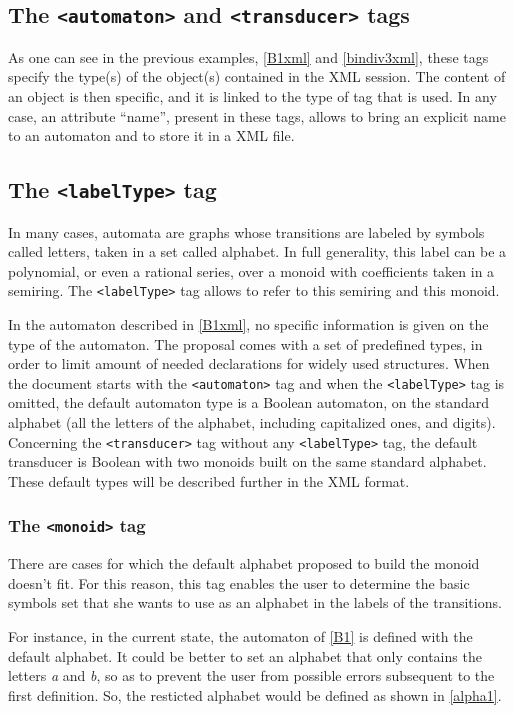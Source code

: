 \documentclass[a4paper]{article}
\newcommand{\xtag}[1]{\texttt{<#1>}}
\def\typetag{\xtag{labelType}}
\def\automatontag{\xtag{automaton}}
\def\transducertag{\xtag{transducer}}
\def\monoidtag{\xtag{monoid}}
\begin{document}
\subsection{The \automatontag{} and \transducertag{} tags}

As one can see in the previous examples, \autoref{B1xml} and
\autoref{bindiv3xml}, these tags specify the type(s) of the object(s)
contained in the XML session. The content of an object is then
specific, and it is linked to the type of tag that is used.  In any
case, an attribute ``name'', present in these tags, allows to bring an
explicit name to an automaton and to store it in a XML file.

\subsection{The \typetag{} tag}

In many cases, automata are graphs whose transitions are labeled by
symbols called letters, taken in a set called alphabet. In full
generality, this label can be a polynomial, or even a rational series,
over a monoid with coefficients taken in a semiring. The \typetag{}
tag allows to refer to this semiring and this monoid.

In the automaton described in \autoref{B1xml}, no specific information
is given on the type of the automaton. The proposal comes with a set
of predefined types, in order to limit amount of needed declarations
for widely used structures. When the document starts with the
\automatontag{} tag and when the \typetag{} tag is omitted, the
default automaton type is a Boolean automaton, on the standard
alphabet (all the letters of the alphabet, including capitalized ones,
and digits).  Concerning the \transducertag{} tag without any
\typetag{} tag, the default transducer is Boolean with two monoids
built on the same standard alphabet.  These default types will be
described further in the XML format.


\subsubsection{The \monoidtag{} tag}

There are cases for which the default alphabet proposed to build the
monoid doesn't fit. For this reason, this tag enables the user to
determine the basic symbols set that she wants to use as an alphabet
in the labels of the transitions.

For instance, in the current state, the automaton of \autoref{B1} is
defined with the default alphabet. It could be better to set an
alphabet that only contains the letters \textit{a} and \textit{b}, so
as to prevent the user from possible errors subsequent to the first
definition. So, the resticted alphabet would be defined as shown in
\autoref{alpha1}.
\end{document}
